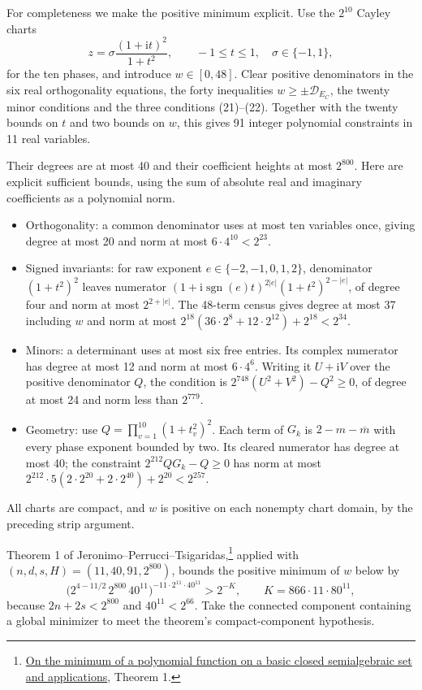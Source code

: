 \documentclass[11pt]{article}
\newcommand{\ii}{\mathrm i}
\begin{document}
For completeness we make the positive minimum explicit. Use the
$2^{10}$ Cayley charts
\[
 z=\sigma\frac{(1+\ii t)^2}{1+t^2},\qquad
 -1\le t\le1,\quad\sigma\in\{-1,1\},
\]
for the ten phases, and introduce $w\in[0,48]$.
Clear positive denominators in the six real orthogonality equations,
the forty inequalities $w\ge\pm\mathcal D_{E_C}$, the twenty minor
conditions and the three conditions (21)--(22). Together with the
twenty bounds on $t$ and two bounds on $w$, this gives 91 integer
polynomial constraints in 11 real variables.

Their degrees are at most 40 and their coefficient heights at most
$2^{800}$. Here are explicit sufficient bounds, using the sum of
absolute real and imaginary coefficients as a polynomial norm.
\begin{itemize}
\item Orthogonality: a common denominator uses at most ten variables
once, giving degree at most 20 and norm at most $6\cdot4^{10}<2^{23}$.
\item Signed invariants: for raw exponent $e\in\{-2,-1,0,1,2\}$,
denominator $(1+t^2)^2$ leaves numerator
$(1+\ii\operatorname{sgn}(e)t)^{2|e|}(1+t^2)^{2-|e|}$,
of degree four and norm at most $2^{2+|e|}$.
The 48-term census gives degree at most 37 including $w$ and norm
at most $2^{18}(36\cdot2^8+12\cdot2^{12})+2^{18}<2^{34}$.
\item Minors: a determinant uses at most six free entries. Its complex
numerator has degree at most 12 and norm at most $6\cdot4^6$.
Writing it $U+\ii V$ over the positive denominator $Q$, the condition
is $2^{748}(U^2+V^2)-Q^2\ge0$, of degree at most 24 and norm less
than $2^{779}$.
\item Geometry: use $Q=\prod_{v=1}^{10}(1+t_v^2)^2$.
Each term of $G_k$ is $2-m-\overline m$ with every phase exponent
bounded by two. Its cleared numerator has degree at most 40;
the constraint $2^{212}QG_k-Q\ge0$ has norm at most
$2^{212}\cdot5(2\cdot2^{20}+2\cdot2^{40})+2^{20}<2^{257}$.
\end{itemize}
All charts are compact, and $w$ is positive on each nonempty chart
domain, by the preceding strip argument.

Theorem 1 of Jeronimo--Perrucci--Tsigaridas,\footnote{
\href{https://arxiv.org/pdf/1112.0544}{On the minimum of a polynomial
function on a basic closed semialgebraic set and applications}, Theorem 1.}
applied with $(n,d,s,H)=(11,40,91,2^{800})$, bounds the positive minimum
of $w$ below by
\[
 \bigl(2^{4-11/2}\,2^{800}\,40^{11}\bigr)^{-11\cdot2^{11}\cdot40^{11}}
 >2^{-K},\qquad K=866\cdot11\cdot80^{11},\tag{23}
\]
because $2n+2s<2^{800}$ and $40^{11}<2^{66}$.
Take the connected component containing a global minimizer to meet
the theorem's compact-component hypothesis.
\end{document}
